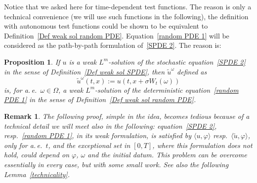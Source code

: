 \documentclass[a4paper,10pt]{article}
\newtheorem{proposition}[theorem]{Proposition}
\newtheorem{remark}[theorem]{Remark}
\newcommand{\lan}{\langle}
\newcommand{\ran}{\rangle}
\newcommand{\td}{\tilde}
\begin{document}
Notice that we asked here for time-dependent test functions. The reason is only a technical convenience (we will use such functions in the following), the definition with autonomous test functions could be shown to be equivalent to Definition~\ref{Def weak sol random PDE}.
Equation~\eqref{random PDE 1} will be considered as the path-by-path
formulation of~\eqref{SPDE 2}. The reason is:

\begin{proposition}
\label{Prop equivalence}If $u$ is a weak $L^{m}$-solution of the stochastic equation~\eqref{SPDE 2} in the sense of Definition~\ref{Def weak sol SPDE}, then $\widetilde{u}^{\omega}$ defined as
\[
\widetilde{u}^{\omega}(t,x)  :=u(t,x+\sigma W_{t}(\omega))
\]
is, for a.\,e.\ $\omega\in\Omega$, a weak $L^{m}$-solution of the deterministic equation~\eqref{random PDE 1} in the sense of Definition~\ref{Def weak sol random PDE}.
\end{proposition}

\begin{remark}\label{techrmk}
The following proof, simple in the idea, becomes tedious because of a technical detail we will meet also in the following: equation~\eqref{SPDE 2}, resp.~\eqref{random PDE 1}, in its weak formulation, is satisfied by $\lan u,\varphi\ran$ resp.\ $\lan\td{u},\varphi\ran$, only for a.\,e.\ $t$, and the exceptional set in $[0,T]$, where this formulation does not hold, could depend on $\varphi$, $\omega$ and the initial datum. This problem can be overcome essentially in every case, but with some small work. See also the following Lemma~\ref{technicality}.
\end{remark}
\end{document}
